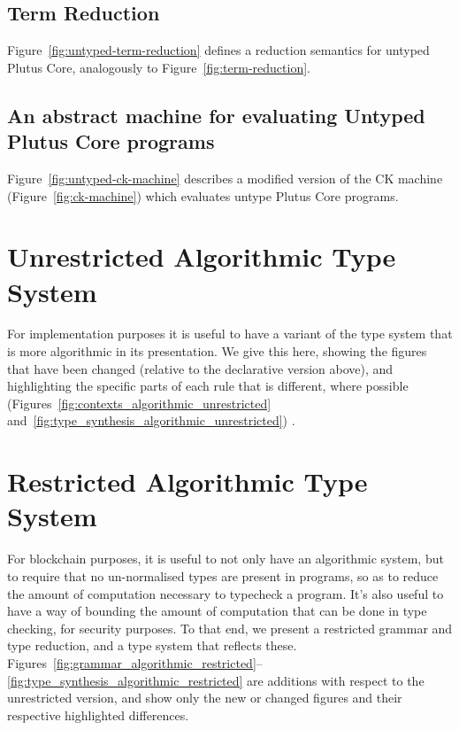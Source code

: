 \documentclass[a4paper]{article}
\begin{document}
\subsection{Term Reduction}
Figure~\ref{fig:untyped-term-reduction} defines a reduction semantics
for untyped Plutus Core, analogously to
Figure~\ref{fig:term-reduction}.



\subsection{An abstract machine for evaluating Untyped Plutus Core programs}
Figure~\ref{fig:untyped-ck-machine} describes a modified version of
the CK machine (Figure~\ref{fig:ck-machine}) which evaluates untype Plutus
Core programs.


\begin{appendices}
\section{Unrestricted Algorithmic Type System}

For implementation purposes it is useful to have a variant of the type
system that is more algorithmic in its presentation. We give this
here, showing the figures that have been changed (relative to the
declarative version above), and highlighting the specific parts of
each rule that is different, where possible
(Figures~\ref{fig:contexts_algorithmic_unrestricted}
and~\ref{fig:type_synthesis_algorithmic_unrestricted}) .



\newpage

\section{Restricted Algorithmic Type System}

For blockchain purposes, it is useful to not only have an algorithmic
system, but to require that no un-normalised types are present in
programs, so as to reduce the amount of computation necessary to
typecheck a program. It's also useful to have a way of bounding the
amount of computation that can be done in type checking, for security
purposes. To that end, we present a restricted grammar and type
reduction, and a type system that reflects these.
Figures~\ref{fig:grammar_algorithmic_restricted}--\ref{fig:type_synthesis_algorithmic_restricted}
are additions with respect to the unrestricted version, and show only
the new or changed figures and their respective highlighted
differences.







\end{appendices}


\end{document}
